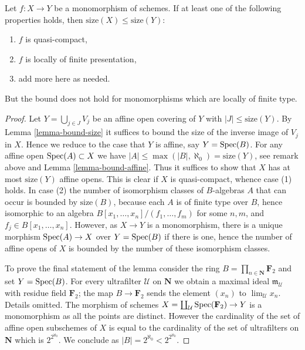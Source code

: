 \begin{lemma}
\label{lemma-bound-monomorphism}
Let $f : X \to Y$ be a monomorphism of schemes.
If at least one of the following properties
holds, then $\text{size}(X) \leq \text{size}(Y)$:
\begin{enumerate}
\item $f$ is quasi-compact,
\item $f$ is locally of finite presentation,
\item add more here as needed.
\end{enumerate}
But the bound does not hold for monomorphisms
which are locally of finite type.
\end{lemma}

\begin{proof}
Let $Y = \bigcup_{j \in J} V_j$ be an affine open covering of $Y$
with $|J| \leq \text{size}(Y)$. By Lemma \ref{lemma-bound-size}
it suffices to bound the size of the inverse image of $V_j$ in $X$.
Hence we reduce to the case that $Y$ is affine, say $Y = \mathop{\mathrm{Spec}}(B)$.
For any affine open $\mathop{\mathrm{Spec}}(A) \subset X$ we have
$|A| \leq \max(|B|, \aleph_0) = \text{size}(Y)$, see remark above
and Lemma \ref{lemma-bound-affine}. Thus it suffices to show
that $X$ has at most $\text{size}(Y)$ affine opens. This is clear
if $X$ is quasi-compact, whence case (1) holds.
In case (2) the number of isomorphism classes of $B$-algebras $A$
that can occur is bounded by $\text{size}(B)$, because each
$A$ is of finite type over $B$, hence isomorphic to an algebra
$B[x_1, \ldots, x_n]/(f_1, \ldots, f_m)$
for some $n, m$, and $f_j \in B[x_1, \ldots, x_n]$. However, as
$X \to Y$ is a monomorphism, there is a unique morphism
$\mathop{\mathrm{Spec}}(A) \to X$ over $Y = \mathop{\mathrm{Spec}}(B)$ if there is one,
hence the number of affine
opens of $X$ is bounded by the number of these isomorphism classes.

\medskip\noindent
To prove the final statement of the lemma consider the ring
$B = \prod_{n \in \mathbf{N}} \mathbf{F}_2$ and set $Y = \mathop{\mathrm{Spec}}(B)$.
For every ultrafilter $\mathcal{U}$ on $\mathbf{N}$ we obtain a maximal
ideal $\mathfrak m_\mathcal{U}$ with residue field $\mathbf{F}_2$;
the map $B \to \mathbf{F}_2$ sends the element $(x_n)$ to
$\lim_\mathcal{U} x_n$. Details omitted.
The morphism of schemes $X = \coprod_\mathcal{U} \mathop{\mathrm{Spec}}(\mathbf{F}_2) \to Y$
is a monomorphism as all the points are distinct. However the cardinality
of the set of affine open subschemes of $X$ is equal to the cardinality
of the set of ultrafilters on $\mathbf{N}$ which is
$2^{2^{\aleph_0}}$. We conclude as $|B| = 2^{\aleph_0} < 2^{2^{\aleph_0}}$.
\end{proof}

